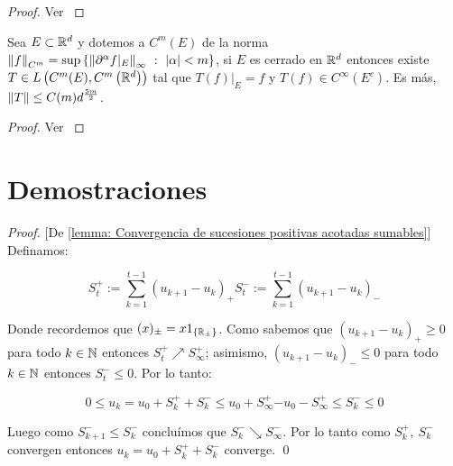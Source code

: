 \begin{proof}
	Ver \cite{dougherty:1989}
\end{proof}

\begin{theorem}
	\label{theorem: Extension de Whitney mejorado}
	Sea $E \subset {\mathbb{R}}^d$ y dotemos a $C^m(E)$ de la norma $\left\lVert f\right\rVert_{C^m} = \sup\left\lbrace\left\lVert\partial^{\alpha}f\vert_E \right\rVert_{\infty} ~:~ \left\lvert\alpha\right\rvert < m\right\rbrace$, si $E$ es cerrado en ${\mathbb{R}}^d$ entonces existe $T \in L\left(C^m(E), C^m\left({\mathbb{R}}^d \right) \right)$ tal que $T(f) \vert_E = f$ y $T(f) \in C^{\infty}(E^c)$. Es m\'as, $\left\lVert T\right\rVert \leq C(m) d^{\frac{5m}{2}}$.
\end{theorem}

\begin{proof}
	Ver \cite{cheng:2015}
\end{proof}

\section{Demostraciones}

\begin{proof}{[De \ref{lemma: Convergencia de sucesiones positivas acotadas sumables}]}
	Definamos:
	
	\begin{subequations}
		\begin{equation}
		S^+_t := \sum\limits_{k=1}^{t-1} {\left(u_{k+1} - u_k\right)_+}
		\end{equation}
		\begin{equation}
		S^-_t := \sum\limits_{k=1}^{t-1} {\left(u_{k+1} - u_k\right)_-}
		\end{equation}
	\end{subequations}
	
	Donde recordemos que $(x)_{\pm} = x1_{\left\lbrace{\mathbb{R}}_{\pm}\right\rbrace}$. Como sabemos que $ {\left(u_{k+1} - u_k\right)_+} \geq 0$ para todo $k \in {\mathbb{N}}$ entonces $S_t^+ \nearrow S_{\infty}^+$; asimismo,  $ {\left(u_{k+1} - u_k\right)_-} \leq 0$ para todo $k \in {\mathbb{N}}$ entonces $S_t^- \leq 0$. Por lo tanto:
	
	\begin{subequations}
		\begin{equation}
		0 \leq u_k = u_0 + S_k^+ + S_k^- \leq u_0 + S_{\infty}^+
		\end{equation}
		\begin{equation}
		-u_0 - S_{\infty}^+ \leq S_k^- \leq 0
		\end{equation}
	\end{subequations}
	
	Luego como $S_{k+1}^- \leq S_k^-$ conclu\'imos que $S_{k}^- \searrow S_{\infty}^-$. Por lo tanto como $S_k^+, \ S_k^-$ convergen entonces $u_k = u_0 + S_k^+ + S_k^- $ converge. \qed
	
\end{proof}

